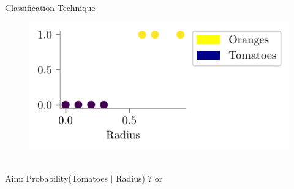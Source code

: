 \documentclass{beamer}
\begin{document}
	\begin{frame}{Classification Technique}
	\begin{minipage}{0.3\textwidth}
		
		\begin{figure}
			
			\includegraphics{../assets/logistic-regression/figures/logistic-orange-tomatoes.pdf}
		\end{figure}
	\end{minipage} \\
	\pause Aim: Probability(Tomatoes $|$ Radius) ? or
	\pause {}
	
\end{frame}
\end{document}
